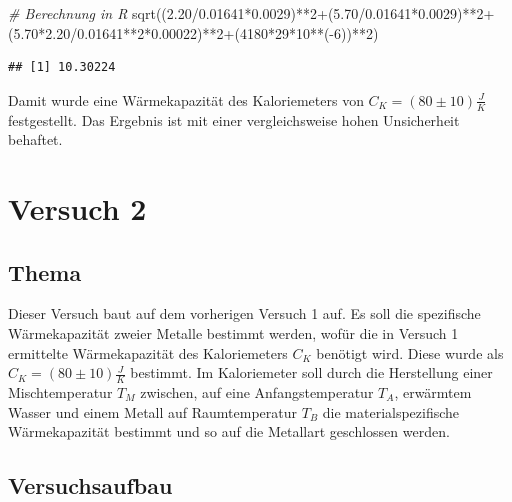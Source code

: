 \documentclass[class=article, crop=false]{standalone}
\newenvironment{Shaded}{\begin{snugshade}}{\end{snugshade}}
\newcommand{\CommentTok}[1]{\textcolor[rgb]{0.56,0.35,0.01}{\textit{#1}}}
\newcommand{\DecValTok}[1]{\textcolor[rgb]{0.00,0.00,0.81}{#1}}
\newcommand{\FloatTok}[1]{\textcolor[rgb]{0.00,0.00,0.81}{#1}}
\newcommand{\FunctionTok}[1]{\textcolor[rgb]{0.00,0.00,0.00}{#1}}
\newcommand{\NormalTok}[1]{#1}
\newcommand{\SpecialCharTok}[1]{\textcolor[rgb]{0.00,0.00,0.00}{#1}}
\begin{document}
\begin{Shaded}
\begin{Highlighting}[]
\CommentTok{\# Berechnung in R}
\FunctionTok{sqrt}\NormalTok{((}\FloatTok{2.20}\SpecialCharTok{/}\FloatTok{0.01641}\SpecialCharTok{*}\FloatTok{0.0029}\NormalTok{)}\SpecialCharTok{**}\DecValTok{2}\SpecialCharTok{+}\NormalTok{(}\FloatTok{5.70}\SpecialCharTok{/}\FloatTok{0.01641}\SpecialCharTok{*}\FloatTok{0.0029}\NormalTok{)}\SpecialCharTok{**}\DecValTok{2}\SpecialCharTok{+}
\NormalTok{       (}\FloatTok{5.70}\SpecialCharTok{*}\FloatTok{2.20}\SpecialCharTok{/}\FloatTok{0.01641}\SpecialCharTok{**}\DecValTok{2}\SpecialCharTok{*}\FloatTok{0.00022}\NormalTok{)}\SpecialCharTok{**}\DecValTok{2}\SpecialCharTok{+}\NormalTok{(}\DecValTok{4180}\SpecialCharTok{*}\DecValTok{29}\SpecialCharTok{*}\DecValTok{10}\SpecialCharTok{**}\NormalTok{(}\SpecialCharTok{{-}}\DecValTok{6}\NormalTok{))}\SpecialCharTok{**}\DecValTok{2}\NormalTok{)}
\end{Highlighting}
\end{Shaded}

\begin{verbatim}
## [1] 10.30224
\end{verbatim}

Damit wurde eine Wärmekapazität des Kaloriemeters von
\(C_K=(80 \pm 10)\frac{J}{K}\) festgestellt. Das Ergebnis ist mit einer
vergleichsweise hohen Unsicherheit behaftet.

\hypertarget{versuch-2}{%
\section{Versuch 2}\label{versuch-2}}

\hypertarget{thema-1}{%
\subsection{Thema}\label{thema-1}}

Dieser Versuch baut auf dem vorherigen Versuch 1 auf. Es soll die
spezifische Wärmekapazität zweier Metalle bestimmt werden, wofür die in
Versuch 1 ermittelte Wärmekapazität des Kaloriemeters \(C_K\) benötigt
wird. Diese wurde als \(C_K=(80 \pm 10)\frac{J}{K}\) bestimmt. Im
Kaloriemeter soll durch die Herstellung einer Mischtemperatur \(T_M\)
zwischen, auf eine Anfangstemperatur \(T_A\), erwärmtem Wasser und einem
Metall auf Raumtemperatur \(T_B\) die materialspezifische Wärmekapazität
bestimmt und so auf die Metallart geschlossen werden.

\hypertarget{versuchsaufbau}{%
\subsection{Versuchsaufbau}\label{versuchsaufbau}}
\end{document}
